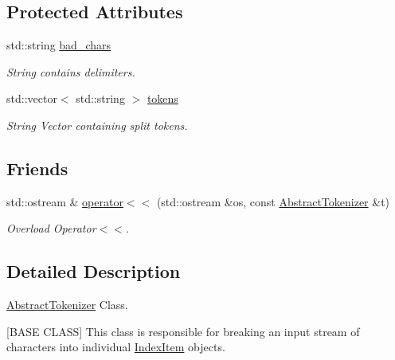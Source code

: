 \subsection*{Protected Attributes}
\begin{DoxyCompactItemize}
\item 
\mbox{\label{class_abstract_tokenizer_a0edd17a67a3d7b9042a5817dc05ba32e}} 
std\+::string \hyperlink{class_abstract_tokenizer_a0edd17a67a3d7b9042a5817dc05ba32e}{bad\+\_\+chars}
\begin{DoxyCompactList}\small\item\em String contains delimiters. \end{DoxyCompactList}\item 
\mbox{\label{class_abstract_tokenizer_a76c3d1105c591f92f1036c327acd36f3}} 
std\+::vector$<$ std\+::string $>$ \hyperlink{class_abstract_tokenizer_a76c3d1105c591f92f1036c327acd36f3}{tokens}
\begin{DoxyCompactList}\small\item\em String Vector containing split tokens. \end{DoxyCompactList}\end{DoxyCompactItemize}
\subsection*{Friends}
\begin{DoxyCompactItemize}
\item 
std\+::ostream \& \hyperlink{class_abstract_tokenizer_a5e19d812ca20914a070862e6336c1432}{operator$<$$<$} (std\+::ostream \&os, const \hyperlink{class_abstract_tokenizer}{Abstract\+Tokenizer} \&t)
\begin{DoxyCompactList}\small\item\em Overload Operator$<$$<$. \end{DoxyCompactList}\end{DoxyCompactItemize}


\subsection{Detailed Description}
\hyperlink{class_abstract_tokenizer}{Abstract\+Tokenizer} Class. 

\mbox{[}B\+A\+SE C\+L\+A\+SS\mbox{]} This class is responsible for breaking an input stream of characters into individual \hyperlink{class_index_item}{Index\+Item} objects. 


